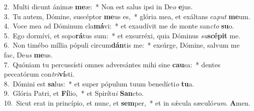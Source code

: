 {2.~}Multi dicunt ánimæ \textbf{me}æ:~* Non est salus ipsi in De\textit{o} \textbf{e}jus.\\
{3.~}Tu autem, Dómine, suscéptor \textbf{me}us es,~* glória mea, et exáltans ca\textit{put} \textbf{me}um.\\
{4.~}Voce mea ad Dóminum cla\textbf{má}vi:~* et exaudívit me de monte san\textit{cto} \textbf{su}o.\\
{5.~}Ego dormívi, et sopo\textbf{rá}tus sum:~* et exsurréxi, quia Dóminus \textit{su}\textbf{scé}\textbf{pit} me.\\
{6.~}Non timébo míllia pópuli circum\textbf{dán}tis me:~* exsúrge, Dómine, salvum me fac, De\textit{us} \textbf{me}us.\\
{7.~}Quóniam tu percussísti omnes adversántes mihi sine \textbf{cau}sa:~* dentes peccatórum con\textit{tri}\textbf{ví}sti.\\
{8.~}Dómini est \textbf{sa}lus:~* et super pópulum tuum benedícti\textit{o} \textbf{tu}a.\\
{9.~}Glória Patri, et \textbf{Fí}lio,~* et Spirítu\textit{i} \textbf{San}cto.\\
{10.~}Sicut erat in princípio, et nunc, et \textbf{sem}per,~* et in sǽcula sæculó\textit{rum}. \textbf{A}men.\\
